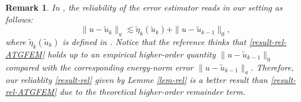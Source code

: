\documentclass[preprint,times]{elsarticle}%
\newtheorem{remark}{Remark}[section]
\numberwithin{algorithm}{section}
\numberwithin{equation}{section}
\newcommand{\anorm}[1]{\|#1\|_a}
\newcommand{\tu}{\tilde{u}}
\begin{document}
\begin{remark}In \cite[Theorem 3.1]{LiYkZhangY21:A908}, the reliability of the error estimator reads in our setting as follows: 
	\begin{equation}\label{result-rel-ATGFEM}
		\anorm{u-\tu_k} \lesssim \tilde{\eta}_k(\tu_k) + \|u-\tu_{k-1}\|_0, 
	\end{equation}
where $\tilde{\eta}_k(\tu_k)$ is defined in \cite[(3.9)]{LiYkZhangY21:A908}. Notice that the reference \cite{LiYkZhangY21:A908} thinks that \eqref{result-rel-ATGFEM} holds up to an empirical higher-order quantity $\|u-\tu_{k-1}\|_0$ compared with the corresponding energy-norm error $\anorm{u-\tu_{k-1}}$. Therefore, our reliablity \eqref{result-rel} given by Lemme \ref{lem-rel} is a better result than \eqref{result-rel-ATGFEM} due to the theoretical higher-order remainder term. 
	
\end{remark}
\end{document}
